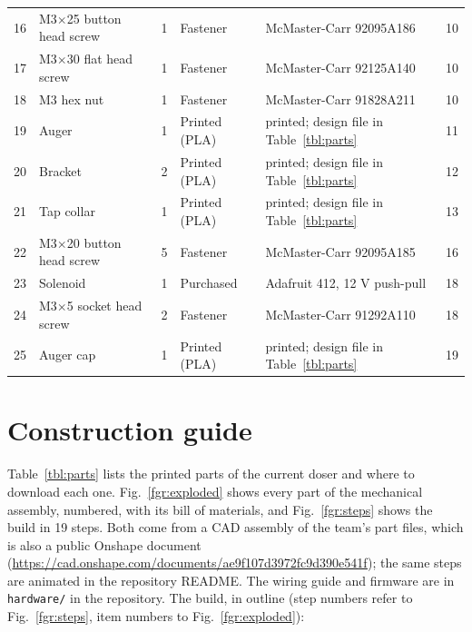 \documentclass[10pt]{article}
\begin{document}
\begin{table}[htbp]
\begin{tabular}{rp{5.2cm}rp{2.0cm}p{5.0cm}r}
16 & M3$\times$25 button head screw & 1 & Fastener & McMaster-Carr 92095A186 & 10 \\
17 & M3$\times$30 flat head screw & 1 & Fastener & McMaster-Carr 92125A140 & 10 \\
18 & M3 hex nut & 1 & Fastener & McMaster-Carr 91828A211 & 10 \\
19 & Auger & 1 & Printed (PLA) & printed; design file in Table~\ref{tbl:parts} & 11 \\
20 & Bracket & 2 & Printed (PLA) & printed; design file in Table~\ref{tbl:parts} & 12 \\
21 & Tap collar & 1 & Printed (PLA) & printed; design file in Table~\ref{tbl:parts} & 13 \\
22 & M3$\times$20 button head screw & 5 & Fastener & McMaster-Carr 92095A185 & 16 \\
23 & Solenoid & 1 & Purchased & Adafruit 412, 12 V push-pull & 18 \\
24 & M3$\times$5 socket head screw & 2 & Fastener & McMaster-Carr 91292A110 & 18 \\
25 & Auger cap & 1 & Printed (PLA) & printed; design file in Table~\ref{tbl:parts} & 19 \\
\bottomrule
\end{tabular}
\end{table}

\section{Construction guide}
\label{sec:build}

Table~\ref{tbl:parts} lists the printed parts of the current doser and where to
download each one. Fig.~\ref{fgr:exploded} shows every part of the mechanical
assembly, numbered, with its bill of materials, and Fig.~\ref{fgr:steps} shows
the build in 19 steps. Both come from a CAD assembly of the team's part files,
which is also a public Onshape document
(\url{https://cad.onshape.com/documents/ae9f107d3972fc9d390e541f}); the same
steps are animated in the repository README. The wiring guide and firmware are
in \texttt{hardware/} in the repository. The build, in outline (step numbers
refer to Fig.~\ref{fgr:steps}, item numbers to Fig.~\ref{fgr:exploded}):
\end{document}
